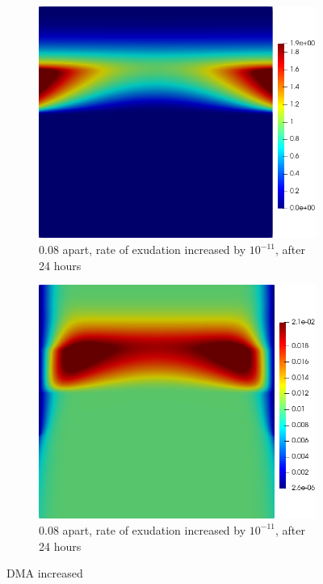 \documentclass[11pt]{article}
\numberwithin{equation}{section}
\begin{document}
 \begin{figure}
     \centering
     \begin{subfigure}[t]{0.35\textwidth}
     \includegraphics[width=\textwidth]{Figures/testpics/IncreasedBufferDMA24.png} %
     \caption{0.08 apart, rate of  exudation increased by $10^{-11}$,  after 24 hours}
     \end{subfigure}
     \hspace{1cm}
     \begin{subfigure}[t]{0.35\textwidth}
     \includegraphics[width=\textwidth]{Figures/testpics/IncreasedBufferZn24.png}
     \caption{0.08 apart, rate of  exudation increased by $10^{-11}$,  after 24 hours}
     \end{subfigure}
     \caption{DMA increased}
 \end{figure}
\end{document}
